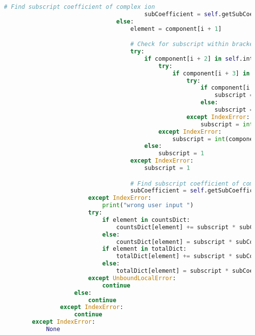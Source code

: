 \documentclass[a4paper,12pt]{article}
\begin{document}
\begin{lstlisting}[language=Python, caption=parseComponent method for finding elements]
                                        # Find subscript coefficient of complex ion
                                        subCoefficient = self.getSubCoefficient(component)
                                else:
                                    element = component[i + 1]

                                    # Check for subscript within brackets
                                    try:
                                        if component[i + 2] in self.integers:
                                            try:
                                                if component[i + 3] in self.integers:
                                                    try:
                                                        if component[i + 4] in self.integers:
                                                            subscript = int(component[(i + 2): (i + 5)])
                                                        else:
                                                            subscript = int(component[(i + 2): (i + 4)])
                                                    except IndexError:
                                                        subscript = int(component[(i + 2): (i + 4)])
                                            except IndexError:
                                                subscript = int(component[i + 2])
                                        else:
                                            subscript = 1
                                    except IndexError:
                                        subscript = 1

                                    # Find subscript coefficient of complex ion
                                    subCoefficient = self.getSubCoefficient(component)
                        except IndexError:
                            print("wrong user input ")
                        try:
                            if element in countsDict:
                                countsDict[element] += subscript * subCoefficient * coefficient
                            else:
                                countsDict[element] = subscript * subCoefficient * coefficient
                            if element in totalDict:
                                totalDict[element] += subscript * subCoefficient * coefficient
                            else:
                                totalDict[element] = subscript * subCoefficient * coefficient
                        except UnboundLocalError:
                            continue
                    else:
                        continue
                except IndexError:
                	continue
        except IndexError:
            None
\end{lstlisting}
\end{document}
